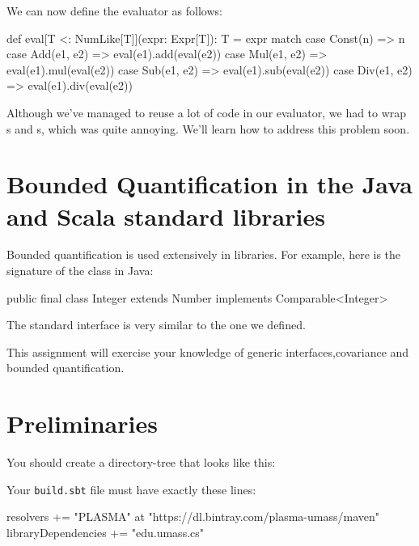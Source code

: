 \documentclass[9pt]{extbook}
\begin{document}
We can now define the evaluator as follows:

\begin{scalacode}
def eval[T <: NumLike[T]](expr: Expr[T]): T = expr match {
  case Const(n) => n
  case Add(e1, e2) => eval(e1).add(eval(e2))
  case Mul(e1, e2) => eval(e1).mul(eval(e2))
  case Sub(e1, e2) => eval(e1).sub(eval(e2))
  case Div(e1, e2) => eval(e1).div(eval(e2))
}
\end{scalacode}

Although we've managed to reuse a lot of code in our evaluator,
we had to wrap s and s, which was
quite annoying. We'll learn how to address this problem soon.

\section{Bounded Quantification in the Java and Scala standard libraries}

Bounded quantification is used extensively in libraries. For example,
here is the signature of the  class in Java:

\begin{scalacode}
public final class Integer extends Number implements Comparable<Integer>
\end{scalacode}

The standard  interface is very similar to the one we
defined.


This assignment will exercise your knowledge of generic interfaces,covariance
and bounded quantification.

\section{Preliminaries}

You should create a directory-tree that looks like this:


Your \texttt{build.sbt} file must have exactly these lines:

\begin{scalacode}
resolvers += "PLASMA" at "https://dl.bintray.com/plasma-umass/maven"
libraryDependencies += "edu.umass.cs" %
\end{scalacode}
\end{document}
